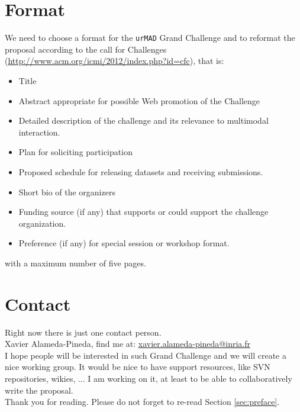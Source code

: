 \documentclass{article}
\begin{document}
 \section{Format}
 We need to choose a format for the \texttt{urMAD} Grand Challenge and to reformat the proposal according to the call
for Challenges (\url{http://www.acm.org/icmi/2012/index.php?id=cfc}), that is:
\begin{itemize}
 \item Title
 \item Abstract appropriate for possible Web promotion of the Challenge
 \item Detailed description of the challenge and its relevance to multimodal interaction.
 \item Plan for soliciting participation
 \item Proposed schedule for releasing datasets and receiving submissions.
 \item Short bio of the organizers
 \item Funding source (if any) that supports or could support the challenge organization.
 \item Preference (if any) for special session or workshop format.
\end{itemize}
with a maximum number of five pages.

 \section{Contact}
 Right now there is just one contact person.\vspace{0.2cm}\\
 Xavier Alameda-Pineda, find me at: \url{xavier.alameda-pineda@inria.fr}\vspace{0.2cm}\\
 I hope people will be interested in such Grand Challenge and we will create a nice working group. It would be nice to
have support resources, like SVN repositories, wikies, ... I am working on it, at least to be able to collaboratively
write the proposal.\vspace{0.3cm}\\
Thank you for reading. Please do not forget to re-read Section \ref{sec:preface}.

% 
% 
% 
% 
\end{document}

